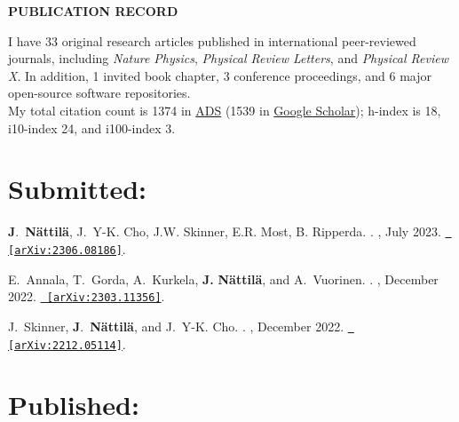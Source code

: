 \documentclass[letterpaper, onecolumn, 11pt]{article}
\begin{document}
\begin{center}
\textbf{PUBLICATION RECORD}
\end{center}

\noindent
I have 33 original research articles published in international peer-reviewed journals, including 
\textit{Nature Physics}, 
\textit{Physical Review Letters}, and 
\textit{Physical Review X}. 
In addition, 1 invited book chapter, 3 conference proceedings, and 6 major open-source software repositories.\\

\noindent
My total citation count is 1374 in \href{https://ui.adsabs.harvard.edu/search/q=%20author%3A%22nattila%22&sort=date%20desc%2C%20bibcode%20desc&p_=0}{ADS}
(1539 in \href{https://scholar.google.com/citations?user=d1fD9oYAAAAJ&hl=en}{Google Scholar}); 
h-index is 18, i10-index 24, and i100-index 3. 


\section*{Submitted:}
\vspace{-1cm}

\begin{thebibliography}{4}

\textbf{J}.~{\textbf{N\"attil\"a}}, J.~Y-K. {Cho}, J.W. Skinner, E.R. Most, B. Ripperda.
.
, July 2023.
\href{http://arxiv.org/abs/2306.08186}{\nolinkurl{ [arXiv:2306.08186]}}.

E.~{Annala}, T.~{Gorda}, A.~{Kurkela}, \textbf{J.} \textbf{{N{\"a}ttil{\"a}}},
  and A.~{Vuorinen}.
.
\newblock {\em }, December 2022.
\href{http://arxiv.org/abs/2303.11356}{\nolinkurl{ [arXiv:2303.11356]}}.

J.~{Skinner}, \textbf{J}.~{\textbf{N\"attil\"a}}, and J.~Y-K. {Cho}.
.
, December 2022.
\href{http://arxiv.org/abs/2212.05114}{\nolinkurl{ [arXiv:2212.05114]}}.


\end{thebibliography}



\section*{Published:}
\vspace{-1cm}
\end{document}
